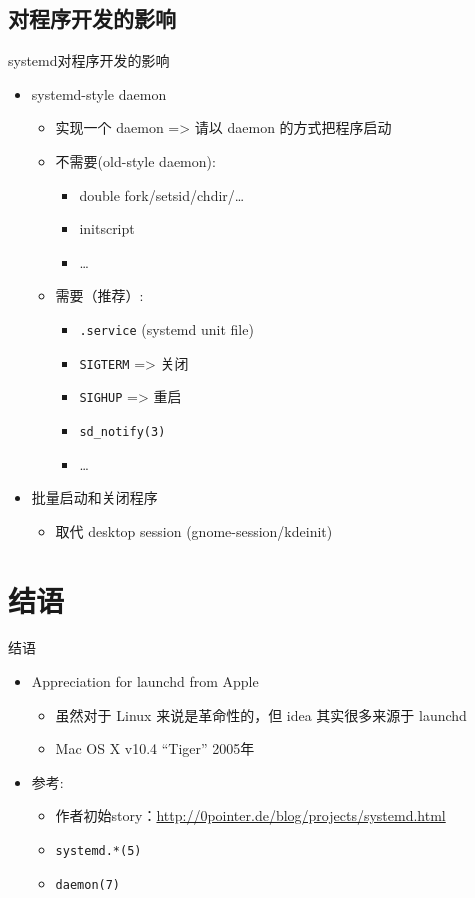 \documentclass[CJK,xetex]{beamer}
\begin{document}
\subsection{对程序开发的影响}
\begin{frame}{systemd对程序开发的影响}
  \begin{itemize}[<+->]
  \item systemd-style daemon
    \begin{itemize}
    \item 实现一个 daemon => 请以 daemon 的方式把程序启动
    \item 不需要(old-style daemon):
      \begin{itemize}
      \item double fork/setsid/chdir/\ldots
      \item initscript
      \item \ldots
      \end{itemize}
    \item 需要（推荐）:
      \begin{itemize}
      \item \texttt{.service} (systemd unit file)
      \item \texttt{SIGTERM} => 关闭
      \item \texttt{SIGHUP} => 重启
      \item \texttt{sd\_notify(3)}
      \item \ldots
      \end{itemize}
    \end{itemize}
  \item 批量启动和关闭程序
    \begin{itemize}
    \item 取代 desktop session (gnome-session/kdeinit)
    \end{itemize}
  \end{itemize}
\end{frame}

\section{结语}
\begin{frame}{结语}
  \begin{itemize}
  \item<1-> Appreciation for launchd from Apple
    \begin{itemize}
    \item<1-> 虽然对于 Linux 来说是革命性的，但 idea 其实很多来源于 launchd
    \item<2-> Mac OS X v10.4 ``Tiger'' 2005年
    \end{itemize}
  \item<3-> 参考:
    \begin{itemize}
    \item 作者初始story：\url{http://0pointer.de/blog/projects/systemd.html}
    \item \texttt{systemd.*(5)}
    \item \texttt{daemon(7)}
    \end{itemize}
  \end{itemize}
\end{frame}
\end{document}
